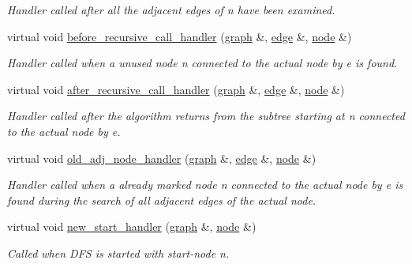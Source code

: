 \begin{DoxyCompactItemize}
\begin{DoxyCompactList}\small\item\em Handler called after all the adjacent edges of {\itshape n} have been examined. \end{DoxyCompactList}\item 
virtual void \mbox{\hyperlink{classdfs_a401190846f59af2a49ba036e99230152}{before\+\_\+recursive\+\_\+call\+\_\+handler}} (\mbox{\hyperlink{classgraph}{graph}} \&, \mbox{\hyperlink{classedge}{edge}} \&, \mbox{\hyperlink{classnode}{node}} \&)
\begin{DoxyCompactList}\small\item\em Handler called when a unused node {\itshape n} connected to the actual node by {\itshape e} is found. \end{DoxyCompactList}\item 
virtual void \mbox{\hyperlink{classdfs_a92fdca8a77b55d08b129aeab4fc66e4c}{after\+\_\+recursive\+\_\+call\+\_\+handler}} (\mbox{\hyperlink{classgraph}{graph}} \&, \mbox{\hyperlink{classedge}{edge}} \&, \mbox{\hyperlink{classnode}{node}} \&)
\begin{DoxyCompactList}\small\item\em Handler called after the algorithm returns from the subtree starting at {\itshape n} connected to the actual node by {\itshape e}. \end{DoxyCompactList}\item 
virtual void \mbox{\hyperlink{classdfs_a33d1d2caa38dd038e03fa4041f5b9521}{old\+\_\+adj\+\_\+node\+\_\+handler}} (\mbox{\hyperlink{classgraph}{graph}} \&, \mbox{\hyperlink{classedge}{edge}} \&, \mbox{\hyperlink{classnode}{node}} \&)
\begin{DoxyCompactList}\small\item\em Handler called when a already marked node {\itshape n} connected to the actual node by {\itshape e} is found during the search of all adjacent edges of the actual node. \end{DoxyCompactList}\item 
virtual void \mbox{\hyperlink{classdfs_a304b14458fb78f9feb3d8d5683d3cab5}{new\+\_\+start\+\_\+handler}} (\mbox{\hyperlink{classgraph}{graph}} \&, \mbox{\hyperlink{classnode}{node}} \&)
\begin{DoxyCompactList}\small\item\em Called when D\+FS is started with start-\/node {\itshape n}. \end{DoxyCompactList}\end{DoxyCompactItemize}
